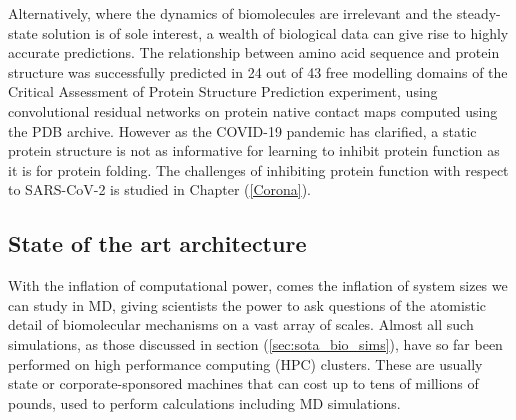 Alternatively, where the dynamics of biomolecules are irrelevant and the steady-state solution is of sole interest, a wealth of biological data can give rise to highly accurate predictions. The relationship between amino acid sequence and protein structure was successfully predicted in 24 out of 43 free modelling domains of the Critical Assessment of Protein Structure Prediction experiment,\cite{kryshtafovych2019critical} using convolutional residual networks on protein native contact maps computed using the PDB archive.\cite{Senior2020} However as the COVID-19 pandemic has clarified, a static protein structure is not as informative for learning to inhibit protein function as it is for protein folding. The challenges of inhibiting protein function with respect to SARS-CoV-2 is studied in Chapter (\ref{Corona}). 

\subsection{State of the art architecture}
With the inflation of computational power, comes the inflation of system sizes we can study in MD, giving scientists the power to ask questions of the atomistic detail of biomolecular mechanisms on a vast array of scales. Almost all such simulations, as those discussed in section (\ref{sec:sota_bio_sims}), have so far been performed on high performance computing (HPC) clusters. These are usually state or corporate-sponsored machines that can cost up to tens of millions of pounds, used to perform calculations including MD simulations. 

